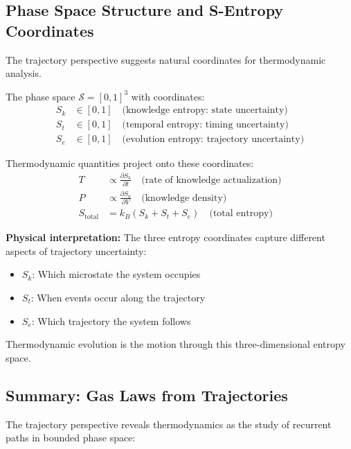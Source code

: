 \subsection{Phase Space Structure and S-Entropy Coordinates}

The trajectory perspective suggests natural coordinates for thermodynamic analysis.

\begin{definition}
\label{def:s_entropy_space}
The phase space $\mathcal{S} = [0,1]^3$ with coordinates:
\begin{align}
S_k &\in [0,1] \quad \text{(knowledge entropy: state uncertainty)} \\
S_t &\in [0,1] \quad \text{(temporal entropy: timing uncertainty)} \\
S_e &\in [0,1] \quad \text{(evolution entropy: trajectory uncertainty)}
\end{align}
\end{definition}

Thermodynamic quantities project onto these coordinates:
\begin{align}
T &\propto \frac{\partial S_k}{\partial t} \quad \text{(rate of knowledge actualization)} \\
P &\propto \frac{\partial S_k}{\partial V} \quad \text{(knowledge density)} \\
S_{\text{total}} &= k_B(S_k + S_t + S_e) \quad \text{(total entropy)}
\end{align}

\textbf{Physical interpretation:} The three entropy coordinates capture different aspects of trajectory uncertainty:
\begin{itemize}
\item $S_k$: Which microstate the system occupies
\item $S_t$: When events occur along the trajectory
\item $S_e$: Which trajectory the system follows
\end{itemize}

Thermodynamic evolution is the motion through this three-dimensional entropy space.

\subsection{Summary: Gas Laws from Trajectories}

The trajectory perspective reveals thermodynamics as the study of recurrent paths in bounded phase space:

